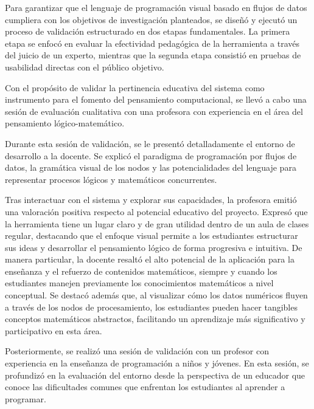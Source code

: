 
Para garantizar que el lenguaje de programación visual basado en flujos de datos cumpliera con los objetivos de investigación planteados, se diseñó y ejecutó un proceso de validación estructurado en dos etapas fundamentales. La primera etapa se enfocó en evaluar la efectividad pedagógica de la herramienta a través del juicio de un experto, mientras que la segunda etapa consistió en pruebas de usabilidad directas con el público objetivo.


Con el propósito de validar la pertinencia educativa del sistema como instrumento para el fomento del pensamiento computacional, se llevó a cabo una sesión de evaluación cualitativa con una profesora con experiencia en el área del pensamiento lógico-matemático.

Durante esta sesión de validación, se le presentó detalladamente el entorno de desarrollo a la docente. Se explicó el paradigma de programación por flujos de datos, la gramática visual de los nodos y las potencialidades del lenguaje para representar procesos lógicos y matemáticos concurrentes.

Tras interactuar con el sistema y explorar sus capacidades, la profesora emitió una valoración positiva respecto al potencial educativo del proyecto. Expresó que la herramienta tiene un lugar claro y de gran utilidad dentro de un aula de clases regular, destacando que el enfoque visual permite a los estudiantes estructurar sus ideas y desarrollar el pensamiento lógico de forma progresiva e intuitiva. De manera particular, la docente resaltó el alto potencial de la aplicación para la enseñanza y el refuerzo de contenidos matemáticos, siempre y cuando los estudiantes manejen previamente los conocimientos matemáticos a nivel conceptual. Se destacó además que, al visualizar cómo los datos numéricos fluyen a través de los nodos de procesamiento, los estudiantes pueden hacer tangibles conceptos matemáticos abstractos, facilitando un aprendizaje más significativo y participativo en esta área.

Posteriormente, se realizó una sesión de validación con un profesor con experiencia en la enseñanza de programación a niños y jóvenes. En esta sesión, se profundizó en la evaluación del entorno desde la perspectiva de un educador que conoce las dificultades comunes que enfrentan los estudiantes al aprender a programar.

